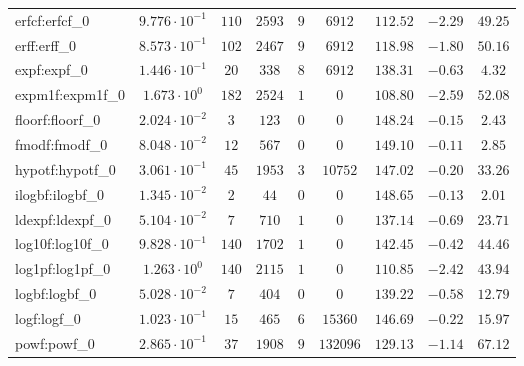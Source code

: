 \begin{tabular}{|l|c|c|c|c|c|c|c|c|}
erfcf:erfcf\_0               & $ 9.776 \cdot 10^{-1} $ & $ 110    $ & $ 2593  $ & $ 9   $ & $ 6912   $ & $ 112.52      $ & $ -2.29   $ & $ 49.25   $ \\
erff:erff\_0                 & $ 8.573 \cdot 10^{-1} $ & $ 102    $ & $ 2467  $ & $ 9   $ & $ 6912   $ & $ 118.98      $ & $ -1.80   $ & $ 50.16   $ \\
expf:expf\_0                 & $ 1.446 \cdot 10^{-1} $ & $ 20     $ & $ 338   $ & $ 8   $ & $ 6912   $ & $ 138.31      $ & $ -0.63   $ & $ 4.32    $ \\
expm1f:expm1f\_0             & $ 1.673 \cdot 10^{0}  $ & $ 182    $ & $ 2524  $ & $ 1   $ & $ 0      $ & $ 108.80      $ & $ -2.59   $ & $ 52.08   $ \\
floorf:floorf\_0             & $ 2.024 \cdot 10^{-2} $ & $ 3      $ & $ 123   $ & $ 0   $ & $ 0      $ & $ 148.24      $ & $ -0.15   $ & $ 2.43    $ \\
fmodf:fmodf\_0               & $ 8.048 \cdot 10^{-2} $ & $ 12     $ & $ 567   $ & $ 0   $ & $ 0      $ & $ 149.10      $ & $ -0.11   $ & $ 2.85    $ \\
hypotf:hypotf\_0             & $ 3.061 \cdot 10^{-1} $ & $ 45     $ & $ 1953  $ & $ 3   $ & $ 10752  $ & $ 147.02      $ & $ -0.20   $ & $ 33.26   $ \\
ilogbf:ilogbf\_0             & $ 1.345 \cdot 10^{-2} $ & $ 2      $ & $ 44    $ & $ 0   $ & $ 0      $ & $ 148.65      $ & $ -0.13   $ & $ 2.01    $ \\
ldexpf:ldexpf\_0             & $ 5.104 \cdot 10^{-2} $ & $ 7      $ & $ 710   $ & $ 1   $ & $ 0      $ & $ 137.14      $ & $ -0.69   $ & $ 23.71   $ \\
log10f:log10f\_0             & $ 9.828 \cdot 10^{-1} $ & $ 140    $ & $ 1702  $ & $ 1   $ & $ 0      $ & $ 142.45      $ & $ -0.42   $ & $ 44.46   $ \\
log1pf:log1pf\_0             & $ 1.263 \cdot 10^{0}  $ & $ 140    $ & $ 2115  $ & $ 1   $ & $ 0      $ & $ 110.85      $ & $ -2.42   $ & $ 43.94   $ \\
logbf:logbf\_0               & $ 5.028 \cdot 10^{-2} $ & $ 7      $ & $ 404   $ & $ 0   $ & $ 0      $ & $ 139.22      $ & $ -0.58   $ & $ 12.79   $ \\
logf:logf\_0                 & $ 1.023 \cdot 10^{-1} $ & $ 15     $ & $ 465   $ & $ 6   $ & $ 15360  $ & $ 146.69      $ & $ -0.22   $ & $ 15.97   $ \\
powf:powf\_0                 & $ 2.865 \cdot 10^{-1} $ & $ 37     $ & $ 1908  $ & $ 9   $ & $ 132096 $ & $ 129.13      $ & $ -1.14   $ & $ 67.12   $ \\

\end{tabular}
